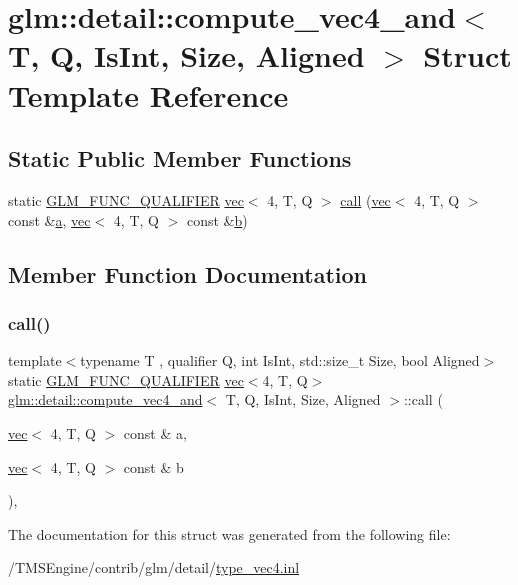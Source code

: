 \hypertarget{structglm_1_1detail_1_1compute__vec4__and}{}\section{glm\+:\+:detail\+:\+:compute\+\_\+vec4\+\_\+and$<$ T, Q, Is\+Int, Size, Aligned $>$ Struct Template Reference}
\label{structglm_1_1detail_1_1compute__vec4__and}
\subsection*{Static Public Member Functions}
\begin{DoxyCompactItemize}
\item 
static \hyperlink{setup_8hpp_a33fdea6f91c5f834105f7415e2a64407}{G\+L\+M\+\_\+\+F\+U\+N\+C\+\_\+\+Q\+U\+A\+L\+I\+F\+I\+ER} \hyperlink{structglm_1_1vec}{vec}$<$ 4, T, Q $>$ \hyperlink{structglm_1_1detail_1_1compute__vec4__and_a4d598ecb932a788803218d4cc2444c9a}{call} (\hyperlink{structglm_1_1vec}{vec}$<$ 4, T, Q $>$ const \&\hyperlink{_s_d_l__opengl__glext_8h_a3309789fc188587d666cda5ece79cf82}{a}, \hyperlink{structglm_1_1vec}{vec}$<$ 4, T, Q $>$ const \&\hyperlink{_s_d_l__opengl__glext_8h_a0f71581a41fd2264c8944126dabbd010}{b})
\end{DoxyCompactItemize}


\subsection{Member Function Documentation}
\mbox{\label{structglm_1_1detail_1_1compute__vec4__and_a4d598ecb932a788803218d4cc2444c9a}} 
\subsubsection{\texorpdfstring{call()}{call()}}
{\footnotesize\ttfamily template$<$typename T , qualifier Q, int Is\+Int, std\+::size\+\_\+t Size, bool Aligned$>$ \\
static \hyperlink{setup_8hpp_a33fdea6f91c5f834105f7415e2a64407}{G\+L\+M\+\_\+\+F\+U\+N\+C\+\_\+\+Q\+U\+A\+L\+I\+F\+I\+ER} \hyperlink{structglm_1_1vec}{vec}$<$4, T, Q$>$ \hyperlink{structglm_1_1detail_1_1compute__vec4__and}{glm\+::detail\+::compute\+\_\+vec4\+\_\+and}$<$ T, Q, Is\+Int, Size, Aligned $>$\+::call (\begin{DoxyParamCaption}\item[{\hyperlink{structglm_1_1vec}{vec}$<$ 4, T, Q $>$ const \&}]{a,  }\item[{\hyperlink{structglm_1_1vec}{vec}$<$ 4, T, Q $>$ const \&}]{b }\end{DoxyParamCaption})\hspace{0.3cm}{\ttfamily [inline]}, {\ttfamily [static]}}



The documentation for this struct was generated from the following file\+:\begin{DoxyCompactItemize}
\item 
/\+T\+M\+S\+Engine/contrib/glm/detail/\hyperlink{type__vec4_8inl}{type\+\_\+vec4.\+inl}\end{DoxyCompactItemize}
